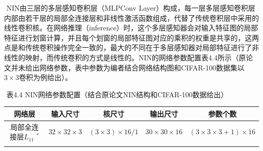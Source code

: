 ​ NIN由三层的多层感知卷积层（MLPConv
Layer）构成，每一层多层感知卷积层内部由若干层的局部全连接层和非线性激活函数组成，代替了传统卷积层中采用的线性卷积核。在网络推理（inference）时，这个多层感知器会对输入特征图的局部特征进行划窗计算，并且每个划窗的局部特征图对应的乘积的权重是共享的，这两点是和传统卷积操作完全一致的，最大的不同在于多层感知器对局部特征进行了非线性的映射，而传统卷积的方式是线性的。NIN的网络参数配置表4.4所示（原论文并未给出网络参数，表中参数为编者结合网络结构图和CIFAR-100数据集以\(3\times3\)卷积为例给出）。

​ 表4.4 NIN网络参数配置（结合原论文NIN结构和CIFAR-100数据给出）

\begin{longtable}[]{ ccccc }
\toprule
\begin{minipage}[b]{0.11\columnwidth}\centering\strut
网络层\strut
\end{minipage} & \begin{minipage}[b]{0.12\columnwidth}\centering\strut
输入尺寸\strut
\end{minipage} & \begin{minipage}[b]{0.11\columnwidth}\centering\strut
核尺寸\strut
\end{minipage} & \begin{minipage}[b]{0.13\columnwidth}\centering\strut
输出尺寸\strut
\end{minipage} & \begin{minipage}[b]{0.12\columnwidth}\centering\strut
参数个数\strut
\end{minipage}\tabularnewline
\midrule
\endhead
\begin{minipage}[t]{0.11\columnwidth}\centering\strut
局部全连接层\(L_{11}\) \(^*\)\strut
\end{minipage} & \begin{minipage}[t]{0.12\columnwidth}\centering\strut
\(32\times32\times3\)\strut
\end{minipage} & \begin{minipage}[t]{0.11\columnwidth}\centering\strut
\((3\times3)\times16/1\)\strut
\end{minipage} & \begin{minipage}[t]{0.13\columnwidth}\centering\strut
\(30\times30\times16\)\strut
\end{minipage} & \begin{minipage}[t]{0.12\columnwidth}\centering\strut
\((3\times3\times3+1)\times16\)\strut
\end{minipage}\tabularnewline
\begin{minipage}[t]{0.11\columnwidth}\centering\strut

\end{minipage}
\end{longtable}

